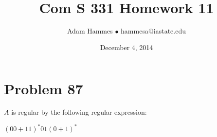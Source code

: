 \documentclass[11pt]{article}
\begin{document}
\title{Com S 331 Homework 11}
\author{Adam Hammes $\bullet$ hammesa@iastate.edu}
\date{December 4, 2014}
\maketitle


\section*{Problem 87} $A$ is regular by the following regular expression: 

$(00 + 11)^* 01 (0+1)^* $
\end{document}

